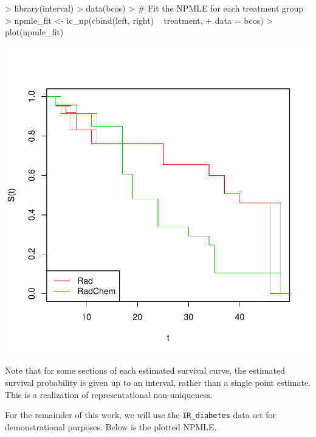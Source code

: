 \documentclass[a4paper]{article}
\begin{document}
\begin{Schunk}
\begin{Sinput}
> library(interval)
> data(bcos)
> # Fit the NPMLE for each treatment group
> npmle_fit <- ic_np(cbind(left, right) ~ treatment,
+              data = bcos)
> plot(npmle_fit)
\end{Sinput}
\end{Schunk}
\includegraphics{StatisticalBackground-004}

  Note that for some sections of each estimated survival curve, the estimated survival probability is given up to an interval, rather than a single point estimate. This is a realization of representational non-uniqueness. 
  
  For the remainder of this work, we will use the \texttt{IR\_diabetes} data set for demonstrational purposes. Below is the plotted NPMLE. 
  
\end{document}
